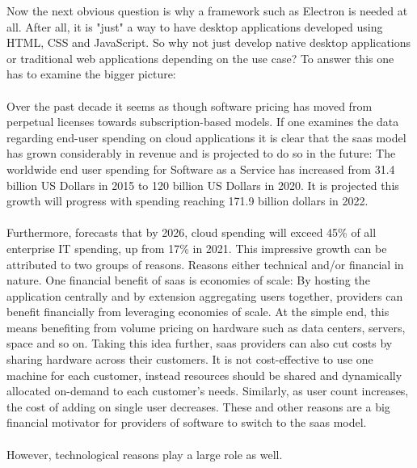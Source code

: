 Now the next obvious question is why a framework such as Electron is needed at all.
After all, it is "just" a way to have desktop applications developed using HTML, CSS and JavaScript.
So why not just develop native desktop applications or traditional web applications depending on the use case?
To answer this one has to examine the bigger picture:\paragraph{}
Over the past decade it seems as though software pricing has moved from perpetual licenses towards subscription-based
models.
If one examines the data regarding end-user spending on cloud applications it is clear that the
\acrfull{saas} model has grown considerably in revenue and is projected to do so in the future:
The worldwide end user spending for Software as a Service has increased from 31.4 billion US Dollars in 2015 to 120
billion US Dollars in 2020.
It is projected this growth will progress with spending reaching 171.9 billion dollars in 2022. \parencite{gartner2021}\paragraph{}
Furthermore, \textcite{gartner2021} forecasts that by 2026, cloud spending will exceed 45\% 
of all enterprise IT spending, up from 17\% in 2021.
This impressive growth can be attributed to two groups of reasons.
Reasons either technical and/or financial in nature.
One financial benefit of \acrshort{saas} is economies of scale:
By hosting the application centrally and by extension aggregating users together, providers can benefit financially from
leveraging economies of scale.
At the simple end, this means benefiting from volume pricing on hardware such as data centers, servers, space and so on.
Taking this idea further, \acrshort{saas} providers can also cut costs by sharing hardware across their customers.
It is not cost-effective to use one machine for each customer, instead resources should be shared and dynamically
allocated on-demand to each customer's needs.
Similarly, as user count increases, the cost of adding on single user decreases.
These and other reasons are a big financial motivator for providers of software to switch to the \acrshort{saas} model. \parencite{jacobs2005}\paragraph{}
However, technological reasons play a large role as well.
